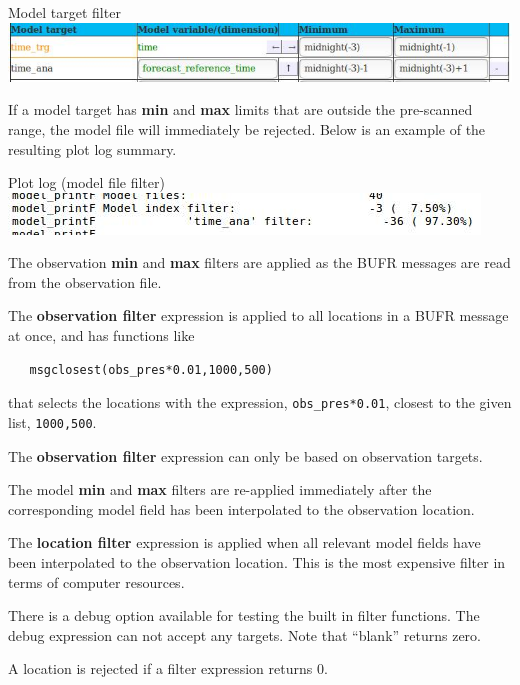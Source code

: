 \documentclass[letterpaper,10pt,twoside,twocolumn,openany]{book}
\begin{document}
\begin{paperbox}{Model target filter}
  \includegraphics[width=\columnwidth]{filter_minmax.jpg}
\end{paperbox}
If a model target has {\bf min} and {\bf max} limits that are outside the pre-scanned range, 
the model file will immediately be rejected. Below is an example of the resulting plot log summary.
\begin{paperbox}{Plot log (model file filter)}
  \includegraphics[width=\columnwidth]{filter_minmaxlog.jpg}
\end{paperbox}

The observation {\bf min} and {\bf max} filters are applied as the BUFR messages are read from the observation file.

The {\bf observation filter} expression is applied to all locations in a BUFR message at once,
and has functions like
\begin{lstlisting}
   msgclosest(obs_pres*0.01,1000,500)
\end{lstlisting}
that selects the locations with the expression, \lstinline!obs_pres*0.01!, closest to the given list, \lstinline!1000,500!.
\begin{quotebox}
  The {\bf observation filter} expression can only be based on observation targets.
\end{quotebox}

The model {\bf min} and {\bf max} filters are re-applied immediately after the corresponding 
model field has been interpolated to the observation location.

The {\bf location filter} expression is applied when all relevant model fields have been interpolated to the observation location.
This is the most expensive filter in terms of computer resources.

There is a debug option available for testing the built in filter functions.
The debug expression can not accept any targets.
Note that ``blank'' returns zero.

\begin{quotebox}
  A location is rejected if a filter expression returns 0.
\end{quotebox}
\end{document}
